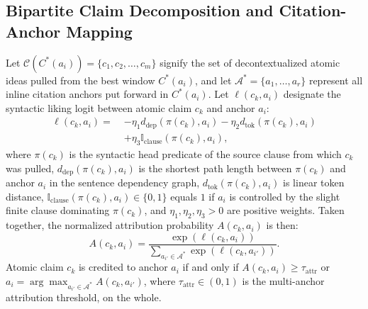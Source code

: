 \documentclass[journal]{IEEEtran}
\begin{document}
\subsection{Bipartite Claim Decomposition and Citation-Anchor Mapping}
Let $\mathcal{C}(C^*(a_i)) = \{c_1, c_2, \dots, c_m\}$ signify the set of decontextualized atomic ideas pulled from the best window $C^*(a_i)$, and let $\mathcal{A}^* = \{a_1, \dots, a_r\}$ represent all inline citation anchors put forward in $C^*(a_i)$. Let $\ell(c_k, a_i)$ designate the syntactic liking logit between atomic claim $c_k$ and anchor $a_i$:
\begin{equation}
\begin{aligned}
\ell(c_k, a_i) = \;& -\eta_1 d_{\text{dep}}(\pi(c_k), a_i) - \eta_2 d_{\text{tok}}(\pi(c_k), a_i) \\
& + \eta_3 \mathbb{I}_{\text{clause}}(\pi(c_k), a_i),
\end{aligned}
\label{eq:bipartite_logit}
\end{equation}
where $\pi(c_k)$ is the syntactic head predicate of the source clause from which $c_k$ was pulled, $d_{\text{dep}}(\pi(c_k), a_i)$ is the shortest path length between $\pi(c_k)$ and anchor $a_i$ in the sentence dependency graph, $d_{\text{tok}}(\pi(c_k), a_i)$ is linear token distance, $\mathbb{I}_{\text{clause}}(\pi(c_k), a_i) \in \{0, 1\}$ equals $1$ if $a_i$ is controlled by the slight finite clause dominating $\pi(c_k)$, and $\eta_1, \eta_2, \eta_3 > 0$ are positive weights. Taken together, the normalized attribution probability $A(c_k, a_i)$ is then:
\begin{equation}
A(c_k, a_i) = \frac{\exp(\ell(c_k, a_i))}{\sum_{a_{i'} \in \mathcal{A}^*} \exp(\ell(c_k, a_{i'}))}.
\label{eq:bipartite}
\end{equation}
Atomic claim $c_k$ is credited to anchor $a_i$ if and only if $A(c_k, a_i) \geq \tau_{\text{attr}}$ or $a_i = \arg\max_{a_{i'} \in \mathcal{A}^*} A(c_k, a_{i'})$, where $\tau_{\text{attr}} \in (0, 1)$ is the multi-anchor attribution threshold, on the whole.
\end{document}
